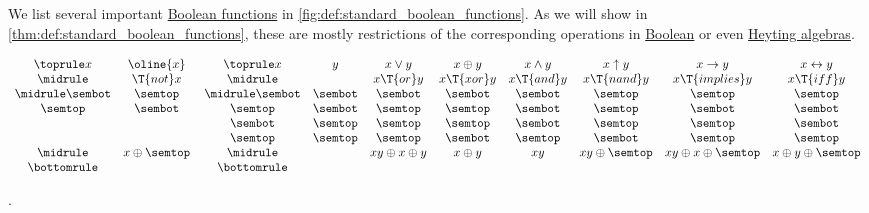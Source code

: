 \begin{definition}\label{def:standard_boolean_functions}
  We list several important \hyperref[def:boolean_function]{Boolean functions} in \cref{fig:def:standard_boolean_functions}. As we will show in \cref{thm:def:standard_boolean_functions}, these are mostly restrictions of the corresponding operations in \hyperref[def:boolean_algebra]{Boolean} or even \hyperref[def:heyting_algebra]{Heyting algebras}.

  \begin{table}
    \begin{equation*}
      \begin{array}{*{2}{c}}
        \toprule
        x       & \oline{x}        \\
        \midrule
                & \T{not} x        \\
        \midrule
        \sembot & \semtop          \\
        \semtop & \sembot          \\
                &                  \\
                &                  \\
        \midrule
                & x \oplus \semtop \\
        \bottomrule
      \end{array}
      \thinspace
      \begin{array}{*{8}{c}}
        \toprule
        x       & y       & x \vee y             & x \oplus y  & x \wedge y  & x \uparrow y      & x \rightarrow y            & x \leftrightarrow y       \\
        \midrule
                &         & x \T{or} y           & x \T{xor} y & x \T{and} y & x \T{nand} y      & x \T{implies} y            & x \T{iff} y               \\
        \midrule
        \sembot & \sembot & \sembot              & \sembot     & \sembot     & \semtop           & \semtop                    & \semtop                   \\
        \semtop & \sembot & \semtop              & \semtop     & \sembot     & \semtop           & \sembot                    & \sembot                   \\
        \sembot & \semtop & \semtop              & \semtop     & \sembot     & \semtop           & \semtop                    & \sembot                   \\
        \semtop & \semtop & \semtop              & \sembot     & \semtop     & \sembot           & \semtop                    & \semtop                   \\
        \midrule
                &         & xy \oplus x \oplus y & x \oplus y  & xy          & xy \oplus \semtop & xy \oplus x \oplus \semtop & x \oplus y \oplus \semtop \\
        \bottomrule
      \end{array}
    \end{equation*}
    \caption{Several important \hyperref[def:boolean_function]{Boolean functions}.}\label{fig:def:standard_boolean_functions}.
  \end{table}


\end{definition}
